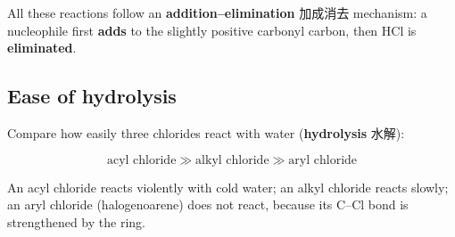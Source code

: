 \documentclass[11pt]{article}
\begin{document}
All these reactions follow an \textbf{addition–elimination} 加成消去 mechanism: a nucleophile first \textbf{adds} to the slightly positive carbonyl carbon, then $\text{HCl}$ is \textbf{eliminated}.

\subsection*{Ease of hydrolysis}

Compare how easily three chlorides react with water (\textbf{hydrolysis} 水解):

\[
\text{acyl chloride} \gg \text{alkyl chloride} \gg \text{aryl chloride}
\]

An acyl chloride reacts violently with cold water; an alkyl chloride reacts slowly; an aryl chloride (halogenoarene) does not react, because its C–Cl bond is strengthened by the ring.
\end{document}
